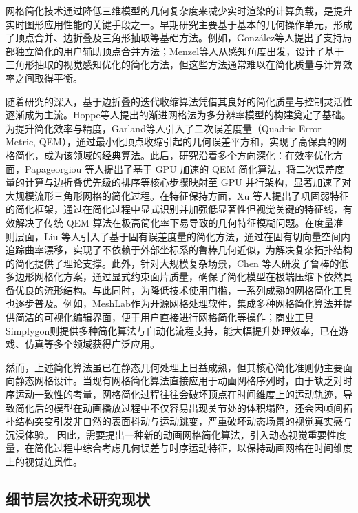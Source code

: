 网格简化技术通过降低三维模型的几何复杂度来减少实时渲染的计算负载，是提升实时图形应用性能的关键手段之一。早期研究主要基于基本的几何操作单元，形成了顶点合并、边折叠及三角形抽取等基础方法。例如，González等人提出了支持局部独立简化的用户辅助顶点合并方法\cite{1-2-19}；Menzel等人从感知角度出发，设计了基于三角形抽取的视觉感知优化的简化方法\cite{1-2-20}，但这些方法通常难以在简化质量与计算效率之间取得平衡。

随着研究的深入，基于边折叠的迭代收缩算法凭借其良好的简化质量与控制灵活性逐渐成为主流。Hoppe等人提出的渐进网格法为多分辨率模型的构建奠定了基础\cite{1-2-21}。为提升简化效率与精度，Garland等人引入了二次误差度量（Quadric Error Metric, QEM），通过最小化顶点收缩引起的几何误差平方和，实现了高保真的网格简化，成为该领域的经典算法\cite{1-2-22}。此后，研究沿着多个方向深化：在效率优化方面，Papageorgiou 等人提出了基于 GPU 加速的 QEM 简化算法，将二次误差度量的计算与边折叠优先级的排序等核心步骤映射至 GPU 并行架构，显著加速了对大规模流形三角形网格的简化过程\cite{1-2-22-1}。在特征保持方面，Xu 等人提出了巩固弱特征的简化框架，通过在简化过程中显式识别并加强低显著性但视觉关键的特征线，有效解决了传统 QEM 算法在极高简化率下易导致的几何特征模糊问题\cite{1-2-22-2}。在度量准则层面，Liu 等人引入了基于固有误差度量的简化方法，通过在固有切向量空间内追踪曲率漂移，实现了不依赖于外部坐标系的鲁棒几何近似，为解决复杂拓扑结构的简化提供了理论支撑\cite{1-2-22-3}。此外，针对大规模复杂场景，Chen 等人研发了鲁棒的低多边形网格化方案，通过显式约束面片质量，确保了简化模型在极端压缩下依然具备优良的流形结构\cite{1-2-22-4}。与此同时，为降低技术使用门槛，一系列成熟的网格简化工具也逐步普及。例如，MeshLab作为开源网格处理软件，集成多种网格简化算法并提供简洁的可视化编辑界面，便于用户直接进行网格简化等操作\cite{1-2-22-6}；商业工具Simplygon则提供多种简化算法与自动化流程支持，能大幅提升处理效率，已在游戏、仿真等多个领域获得广泛应用\cite{1-2-22-7}。

然而，上述简化算法虽已在静态几何处理上日益成熟，但其核心简化准则仍主要面向静态网格设计。当现有网格简化算法直接应用于动画网格序列时，由于缺乏对时序运动一致性的考量，网格简化过程往往会破坏顶点在时间维度上的运动轨迹，导致简化后的模型在动画播放过程中不仅容易出现关节处的体积塌陷，还会因帧间拓扑结构突变引发非自然的表面抖动与运动跳变，严重破坏动态场景的视觉真实感与沉浸体验。
因此，需要提出一种新的动画网格简化算法，引入动态视觉重要性度量，在简化过程中综合考虑几何误差与时序运动特征，以保持动画网格在时间维度上的视觉连贯性。

\subsection{细节层次技术研究现状}


